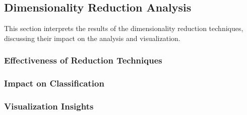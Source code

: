 \subsection{Dimensionality Reduction Analysis}
\label{subsec:discussion-reduction}

This section interprets the results of the dimensionality reduction techniques, discussing their impact on the analysis and visualization.


\subsubsection{Effectiveness of Reduction Techniques}

\subsubsection{Impact on Classification}

\subsubsection{Visualization Insights}

